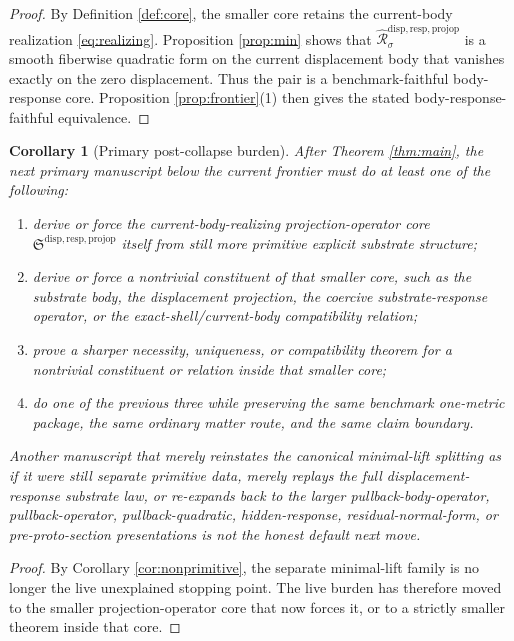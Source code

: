\documentclass[11pt]{article}
\newcommand{\ProjectionOperatorCore}{\mathfrak S^{\mathrm{disp,resp,projop}}}
\newcommand{\CoreForcedBodyResponse}[1]{\widehat{\mathscr R}_{#1}^{\mathrm{disp,resp,projop}}}
\newtheorem{corollary}{Corollary}
\begin{document}
\begin{proof}
By Definition \ref{def:core}, the smaller core retains the current-body realization \eqref{eq:realizing}. Proposition \ref{prop:min} shows that \(\CoreForcedBodyResponse{\sigma}\) is a smooth fiberwise quadratic form on the current displacement body that vanishes exactly on the zero displacement. Thus the pair is a benchmark-faithful body-response core. Proposition \ref{prop:frontier}(1) then gives the stated body-response-faithful equivalence.
\end{proof}

\begin{corollary}[Primary post-collapse burden]
\label{cor:next}
After Theorem \ref{thm:main}, the next primary manuscript below the current frontier must do at least one of the following:
\begin{enumerate}
    \item derive or force the current-body-realizing projection-operator core \(\ProjectionOperatorCore\) itself from still more primitive explicit substrate structure;
    \item derive or force a nontrivial constituent of that smaller core, such as the substrate body, the displacement projection, the coercive substrate-response operator, or the exact-shell/current-body compatibility relation;
    \item prove a sharper necessity, uniqueness, or compatibility theorem for a nontrivial constituent or relation inside that smaller core;
    \item do one of the previous three while preserving the same benchmark one-metric package, the same ordinary matter route, and the same claim boundary.
\end{enumerate}
Another manuscript that merely reinstates the canonical minimal-lift splitting as if it were still separate primitive data, merely replays the full displacement-response substrate law, or re-expands back to the larger pullback-body-operator, pullback-operator, pullback-quadratic, hidden-response, residual-normal-form, or pre-proto-section presentations is not the honest default next move.
\end{corollary}

\begin{proof}
By Corollary \ref{cor:nonprimitive}, the separate minimal-lift family is no longer the live unexplained stopping point. The live burden has therefore moved to the smaller projection-operator core that now forces it, or to a strictly smaller theorem inside that core.
\end{proof}
\end{document}
